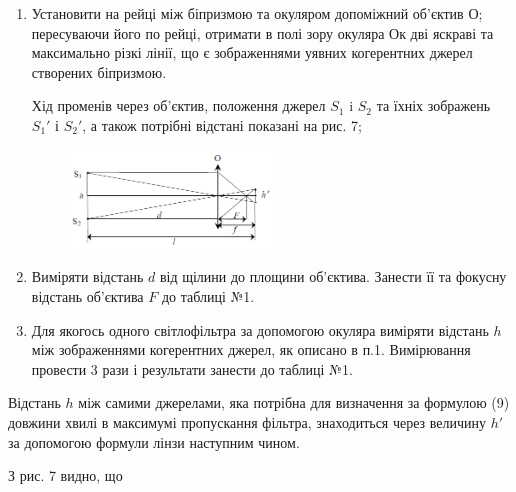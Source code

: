 \documentclass[12pt,a4paper]{article}
\begin{document}
    \begin{enumerate}

        \item Установити на рейці між біпризмою та окуляром допоміжний
        об'єктив О; пересуваючи його по рейці, отримати в полі зору окуляра Ок дві
        яскраві та максимально різкі лінії, що є зображеннями уявних когерентних
        джерел створених біпризмою.

        Хід променів через об’єктив, положення джерел $S_1$ i $S_2$ та їхніх зображень 
        $S_1'$ і $S_2'$, а також потрібні відстані показані на рис. 7;

        \begin{figure}[!ht]

            \renewcommand{\thefigure}{\arabic{figure}} %
    
            \centering
            \includegraphics[width=0.5\textwidth]{7.png}
            \caption{}
            \label{fig7:schema}
    
        \end{figure}

        \item Виміряти відстань $d$ від щілини до площини об'єктива.
        Занести її та фокусну відстань об'єктива $F$ до таблиці №1.

        \item Для якогось одного світлофільтра за допомогою окуляра виміряти відстань
        $h$ між зображеннями когерентних джерел, як описано в п.1. 
        Вимірювання провести 3 рази і результати занести до таблиці №1.

    \end{enumerate}

    Відстань $h$ між самими джерелами, яка потрібна для визначення за формулою (9)
    довжини хвилі в максимумі пропускання фільтра, знаходиться через величину
    $h'$ за допомогою формули лінзи наступним чином.

    З рис. 7 видно, що
\end{document}
